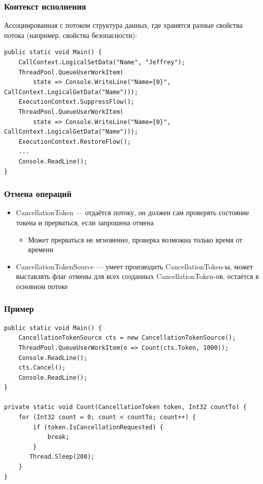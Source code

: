 \documentclass[xetex,mathserif,serif]{beamer}
\begin{document}
	\begin{frame}[fragile]
		\frametitle{Контекст исполнения}
		\begin{footnotesize}
			Ассоциированная с потоком структура данных, где хранятся разные свойства потока (например, свойства безопасности):
			\begin{verbatim}
public static void Main() {
    CallContext.LogicalSetData("Name", "Jeffrey");
    ThreadPool.QueueUserWorkItem(
        state => Console.WriteLine("Name={0}", CallContext.LogicalGetData("Name")));
    ExecutionContext.SuppressFlow();
    ThreadPool.QueueUserWorkItem(
        state => Console.WriteLine("Name={0}", CallContext.LogicalGetData("Name")));
    ExecutionContext.RestoreFlow();
    ...
    Console.ReadLine();
}
			\end{verbatim}
		\end{footnotesize}
	\end{frame}

	\begin{frame}
		\frametitle{Отмена операций}
		\begin{itemize}
			\item CancellationToken --- отдаётся потоку, он должен сам проверять состояние токена и прерваться, если запрошена отмена
			\begin{itemize}
				\item Может прерваться не мгновенно, проверка возможна только время от времени
			\end{itemize}
			\item CancellationTokenSource --- умеет производить CancellationToken-ы, может выставлять флаг отмены для всех созданных CancellationToken-ов, остаётся в основном потоке
		\end{itemize}
	\end{frame}

	\begin{frame}[fragile]
		\frametitle{Пример}
		\begin{small}
			\begin{verbatim}
public static void Main() {
    CancellationTokenSource cts = new CancellationTokenSource();
    ThreadPool.QueueUserWorkItem(o => Count(cts.Token, 1000));
    Console.ReadLine();
    cts.Cancel();
    Console.ReadLine();
}

private static void Count(CancellationToken token, Int32 countTo) {
    for (Int32 count = 0; count < countTo; count++) {
        if (token.IsCancellationRequested) {
            break;
        }
       Thread.Sleep(200); 
    }
}
			\end{verbatim}
		\end{small}
	\end{frame}
\end{document}

